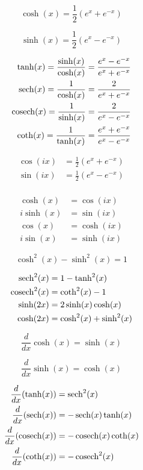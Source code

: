 \begin{equation*}
    \cosh(x) = \frac{1}{2}(e^x + e^{-x})
\end{equation*}

\begin{equation*}
    \sinh(x) = \frac{1}{2}(e^x - e^{-x})
\end{equation*}

\begin{align*}
    \tanh(x) = \frac{\sinh(x)}{\cosh(x)} = \frac{e^x - e^{-x}}{e^x + e^{-x}}\\
    \operatorname{sech}(x) = \frac{1}{\cosh(x)} = \frac{2}{e^x + e^{-x}}\\
    \operatorname{cosech}(x) = \frac{1}{\sinh(x)} = \frac{2}{e^x - e^{-x}}\\
    \coth(x) = \frac{1}{\tanh(x)} = \frac{e^x + e^{-x}}{e^x - e^{-x}}\\
\end{align*}

\begin{align*}
    \cos(ix) &= \frac{1}{2}(e^x + e^{-x})\\
    \sin(ix) &= \frac{1}{2}(e^x - e^{-x})\\
\end{align*}

\begin{align*}
    \cosh(x) &= \cos(ix)\\
    i\sinh(x) &= \sin(ix)\\
    \cos(x) &= \cosh(ix)\\
    i\sin(x) &= \sinh(ix)
\end{align*}

\begin{equation*}
    \cosh^2(x) - \sinh^2(x) = 1
\end{equation*}

\begin{align*}
    \operatorname{sech}^2(x) &= 1 - \tanh^2(x)\\
    \operatorname{cosech}^2(x) &= \coth^2(x) -1\\
    \sinh(2x) &= 2\sinh(x)\cosh(x)\\
    \cosh(2x) &= \cosh^2(x) + \sinh^2(x)\\
\end{align*}

\begin{equation*}
    \frac{d}{dx}\cosh(x) = \sinh(x)
\end{equation*}

\begin{equation*}
    \frac{d}{dx}\sinh(x) = \cosh(x)
\end{equation*}

\begin{align*}
    \frac{d}{dx}(\tanh(x)) &= \operatorname{sech}^2(x)\\
    \frac{d}{dx}(\operatorname{sech}(x)) &= -\operatorname{sech}(x)\tanh(x)\\
    \frac{d}{dx}(\operatorname{cosech}(x)) &= -\operatorname{cosech}(x)\coth(x)\\
    \frac{d}{dx}(\coth(x)) &= -\operatorname{cosech}^2(x)\\
\end{align*}